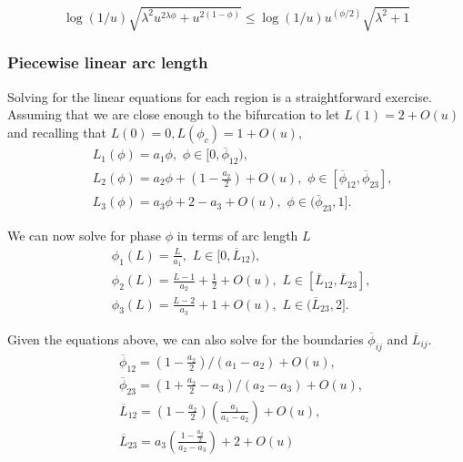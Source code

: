 \begin{equation}
 \log(1/u)\sqrt{\lambda^2 u^{2 \lambda \phi} + u^{2(1-\phi)}} \leq \log(1/u) u^{(\phi/2)} \sqrt{\lambda^2 + 1}
\end{equation}


\subsubsection{Piecewise linear arc length}


Solving for the linear equations for each region is a straightforward exercise.  Assuming that we are close enough to the bifurcation to let $L(1) = 2 + O(u)$ and recalling that $L(0)=0, L(\phi_c)=1 + O(u)$,
\begin{align}
 &L_1(\phi) = a_1 \phi, \, \, \phi \in [0, \overline \phi_{12}),\\
 &L_2(\phi) = a_2 \phi + (1-\frac{a_2}{2}) + O(u), \, \, \phi \in [\overline \phi_{12}, \overline \phi_{23}],\\\
 &L_3(\phi) = a_3 \phi + 2-a_3 + O(u), \, \, \phi \in ( \overline \phi_{23}, 1].
\end{align}


We can now solve for phase $\phi$ in terms of arc length $L$
\begin{align}
 &\phi_1(L) = \frac{L}{a_1}, \, \, L \in [0,\overline L_{12}),\\
 &\phi_2(L) = \frac{L-1}{a_2}+\frac{1}{2}+ O(u), \, \, L \in [\overline L_{12}, \overline L_{23}],\\
 &\phi_3(L) = \frac{L-2}{a_3}+1 + O(u), \, \, L \in (\overline L_{23},2].
\end{align}


Given the equations above, we can also solve for the boundaries $\overline\phi_{ij}$ and $\overline L_{ij}$.
\begin{align}
 &\overline\phi_{12} = (1-\frac{a_2}{2})/(a_1-a_2) + O(u),\\
 &\overline\phi_{23} = (1+\frac{a_2}{2}-a_3)/(a_2-a_3) + O(u),\\
 &\overline L_{12} = \left (1-\frac{a_2}{2} \right ) \left ( \frac{a_1}{a_1-a_2} \right) + O(u),\\
 &\overline L_{23} = a_3 \left ( \frac{1-\frac{a_2}{2}}{a_2-a_3} \right)+2 + O(u)
\end{align}


